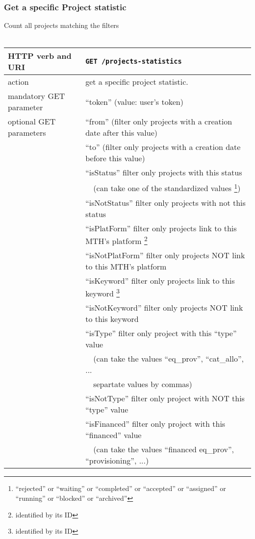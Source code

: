 \subsubsection{Get a specific Project statistic}
\hspace*{\parindent}
Count all projects matching the filters
\\~\\
\begin{tabular}{ | l | l | }
	\hline
	HTTP verb and URI & \texttt{GET /projects-statistics} \\
	\hline
	action & get a specific project statistic. \\
	\hline
	mandatory GET parameter & ``token'' (value: user's token) \\
	\hline
	optional GET parameters & ``from'' (filter only projects with a creation date after this value) \\
	\space & ``to'' (filter only projects with a creation date before this value) \\
	\space & ``isStatus'' filter only projects with this status \\
	\space & ~~(can take one of the standardized values \footnote{``rejected'' or ``waiting'' or ``completed'' or ``accepted'' or ``assigned'' or ``running'' or ``blocked'' or ``archived''}) \\
	\space & ``isNotStatus'' filter only projects with not this status \\
	\space & ``isPlatForm'' filter only projects link to this MTH's platform \footnote{identified by its ID} \\
	\space & ``isNotPlatForm'' filter only projects NOT link to this MTH's platform  \\
	\space & ``isKeyword'' filter only projects link to this keyword \footnote{identified by its ID} \\
	\space & ``isNotKeyword'' filter only projects NOT link to this keyword \\
	\space & ``isType'' filter only project with this ``type'' value \\
	\space & ~~(can take the values ``eq\_prov'', ``cat\_allo'', ... \\
	\space & ~~separtate values by commas) \\
	\space & ``isNotType'' filter only project with NOT this ``type'' value \\
	\space & ``isFinanced'' filter only project with this ``financed'' value \\
	\space & ~~(can take the values ``financed eq\_prov'', ``provisioning'', ...) \\

\end{tabular}
